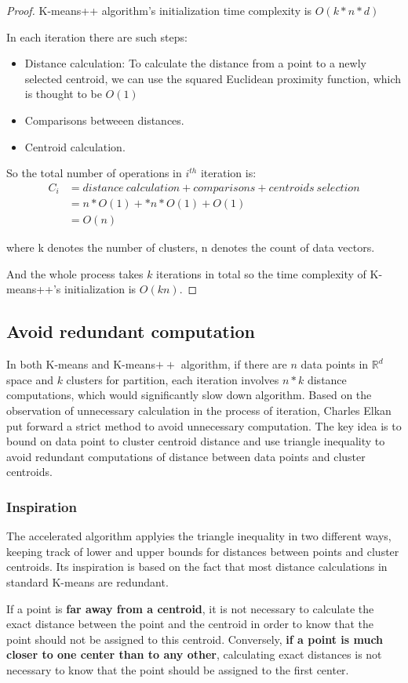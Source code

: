 \documentclass[11pt]{article}
\begin{document}
\begin{proof}
  K-means++ algorithm's initialization time complexity is $O(k*n*d)$
  \par In each iteration there are such steps:
  \begin{itemize}
    \item Distance calculation: To calculate the distance from a point to a newly selected centroid, we can use the squared Euclidean proximity function, which is thought to be $O(1)$
    \item Comparisons betweeen distances.
    \item Centroid calculation.
  \end{itemize}
  \par So the total number of operations in $i^{th}$ iteration is:
  \begin{equation*}
    \begin{split}
      C_i &=  distance\ calculation + comparisons + centroids\ selection\\
      & = n * O(1) + * n * O(1) + O(1) \\
      & = O(n)
    \end{split}
  \end{equation*}
  \par where k denotes the number of clusters, n denotes the count of data vectors.
  \par And the whole process takes $k$ iterations in total so the time complexity of K-means++'s initialization is $O(kn)$.
\end{proof}

\subsection{Avoid redundant computation}
In both K-means and K-means$++$ algorithm, if there are $n$ data points in $\mathbb{R}^ d$ space and $k$ clusters for partition, each iteration involves $n * k$ distance computations, which would significantly slow down algorithm. Based on the observation of  unnecessary calculation in the process of iteration, Charles Elkan put forward a strict method to avoid unnecessary computation.\cite{articleToBound} The key idea is to bound on data point to cluster centroid distance and use triangle inequality to avoid redundant computations of distance between data points and cluster centroids.

\subsubsection{Inspiration}
The accelerated algorithm applyies the triangle inequality in two different ways, keeping track of lower and upper bounds for distances between points and cluster centroids. Its inspiration is based on the fact that most distance calculations in standard K-means are redundant. \par
If a point is \textbf{far away from a centroid}, it is not necessary to calculate the exact distance between the point and the centroid in order to know that the point should not be assigned to this centroid. Conversely, \textbf{if a point is much closer to one center than to any other}, calculating exact distances is not necessary to know that the point should be assigned to the first center. 
\end{document}
